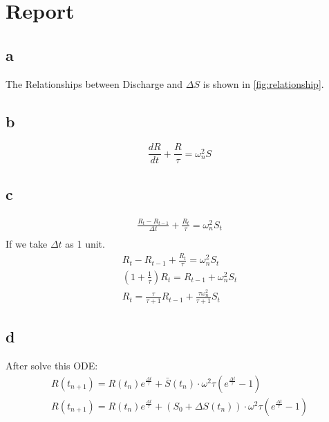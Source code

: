 \chapter{Report}
\section{a}
The Relationships between Discharge and $\Delta S$ is shown in \autoref{fig:relationship}.
\begin{figure}[htpb]\centering
	\caption{}
	\label{fig:relationship}
\end{figure}
\section{b}
\begin{equation*}
	\frac{dR}{dt} + \frac{R}{\tau} = \omega^2_n S
\end{equation*}
\section{c}
\begin{gather*}
	\frac{R_t - R_{t-1}}{\Delta t} + \frac{R_t}{\tau} = \omega^2_n S_t \\
\end{gather*}
If we take $\Delta t$ as 1 unit.
\begin{gather*}
	R_t - R_{t-1} + \frac{R_t}{\tau} = \omega^2_n S_t \\
	\left(1+\frac{1}{\tau}\right) R_{t} = R_{t-1} +  \omega^2_n S_t \\
	R_{t} = \frac{\tau}{\tau + 1} R_{t-1} + \frac{\tau \omega_n^2}{\tau + 1}S_t
\end{gather*}
\section{d}
After solve this ODE:
\begin{gather*}
	R(t_{n+1}) = R(t_{n}) e^{\frac{\Delta t}{\tau}} + \bar{S}(t_{n}) \cdot \omega^2 \tau (e^{\frac{\Delta t}{\tau}} - 1) \\
	R(t_{n+1}) = R(t_{n}) e^{\frac{\Delta t}{\tau}} + \left(S_0 + \Delta S(t_{n})\right) \cdot \omega^2 \tau (e^{\frac{\Delta t}{\tau}} - 1)
\end{gather*}
